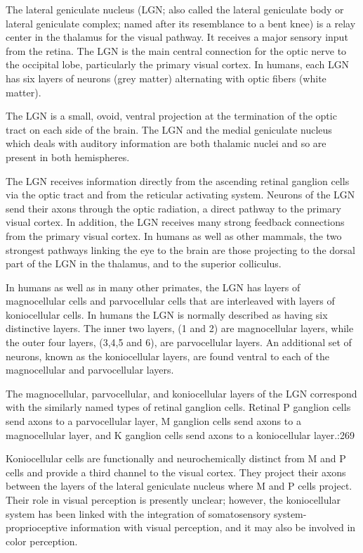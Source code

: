The lateral geniculate nucleus (LGN; also called the lateral geniculate
body or lateral geniculate complex; named after its resemblance to a
bent knee) is a relay center in the thalamus for the visual pathway. It
receives a major sensory input from the retina. The LGN is the main
central connection for the optic nerve to the occipital lobe,
particularly the primary visual cortex. In humans, each LGN has six
layers of neurons (grey matter) alternating with optic fibers (white
matter).

The LGN is a small, ovoid, ventral projection at the termination of the
optic tract on each side of the brain. The LGN and the medial geniculate
nucleus which deals with auditory information are both thalamic nuclei
and so are present in both hemispheres.

The LGN receives information directly from the ascending retinal
ganglion cells via the optic tract and from the reticular activating
system. Neurons of the LGN send their axons through the optic radiation,
a direct pathway to the primary visual cortex. In addition, the LGN
receives many strong feedback connections from the primary visual
cortex. In humans as well as other mammals, the two strongest pathways
linking the eye to the brain are those projecting to the dorsal part of
the LGN in the thalamus, and to the superior colliculus.

In humans as well as in many other primates, the LGN has layers of
magnocellular cells and parvocellular cells that are interleaved with
layers of koniocellular cells. In humans the LGN is normally described
as having six distinctive layers. The inner two layers, (1 and 2) are
magnocellular layers, while the outer four layers, (3,4,5 and 6), are
parvocellular layers. An additional set of neurons, known as the
koniocellular layers, are found ventral to each of the magnocellular and
parvocellular layers.

The magnocellular, parvocellular, and koniocellular layers of the LGN
correspond with the similarly named types of retinal ganglion cells.
Retinal P ganglion cells send axons to a parvocellular layer, M ganglion
cells send axons to a magnocellular layer, and K ganglion cells send
axons to a koniocellular layer.:269

Koniocellular cells are functionally and neurochemically distinct from M
and P cells and provide a third channel to the visual cortex. They
project their axons between the layers of the lateral geniculate nucleus
where M and P cells project. Their role in visual perception is
presently unclear; however, the koniocellular system has been linked
with the integration of somatosensory system-proprioceptive information
with visual perception, and it may also be involved in color perception.

